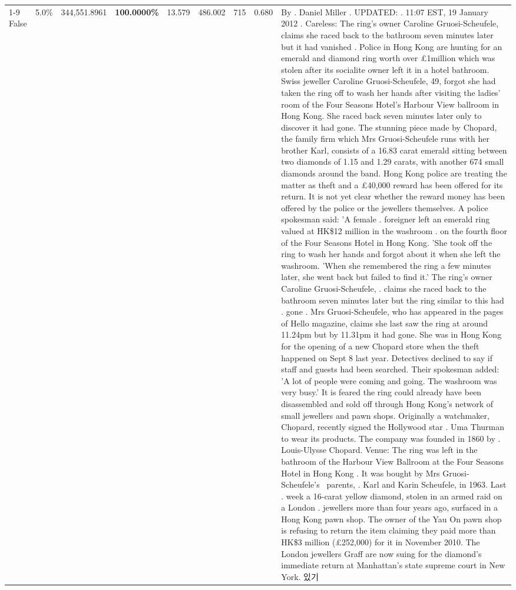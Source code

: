 \begin{table}[H]
\begin{tabular}{lllrlllll}
\cline{1-9}
False & 5.0\% & 344,551.8961 & \bfseries \color{red} 100.0000\% & 13.579 & 486.002 & 715 & 0.680 & By . Daniel Miller . UPDATED: . 11:07 EST, 19 January 2012 . Careless: The ring's owner Caroline Gruosi-Scheufele, claims she raced back to the bathroom seven minutes later but it had vanished . Police in Hong Kong are hunting for an emerald and diamond ring worth over £1million which was stolen after its socialite owner left it in a hotel bathroom. Swiss jeweller Caroline Gruosi-Scheufele, 49, forgot she had taken the ring off to wash her hands after visiting the ladies' room of the Four Seasons Hotel's Harbour View ballroom in Hong Kong. She raced back seven minutes later only to discover it had gone. The stunning piece made by Chopard, the family firm which Mrs Gruosi-Scheufele runs with her brother Karl, consists of a 16.83 carat emerald sitting between two diamonds of 1.15 and 1.29 carats, with another 674 small diamonds around the band. Hong Kong police are treating the matter as theft and a £40,000 reward has been offered for its return. It is not yet clear whether the reward money has been offered by the police or the jewellers themselves. A police spokesman said: 'A female . foreigner left an emerald ring valued at HK\$12 million in the washroom . on the fourth floor of the Four Seasons Hotel in Hong Kong. 'She took off the ring to wash her hands and forgot about it when she left the washroom. 'When she remembered the ring a few minutes later, she went back but failed to find it.' The ring's owner Caroline Gruosi-Scheufele, . claims she raced back to the bathroom seven minutes later but the ring similar to this had . gone . Mrs Gruosi-Scheufele, who has appeared in the pages of Hello magazine, claims she last saw the ring at around 11.24pm but by 11.31pm it had gone. She was in Hong Kong for the opening of a new Chopard store when the theft happened on Sept 8 last year. Detectives declined to say if staff and guests had been searched. Their spokesman added: 'A lot of people were coming and going. The washroom was very busy.' It is feared the ring could already have been disassembled and sold off through Hong Kong's network of small jewellers and pawn shops. Originally a watchmaker, Chopard, recently signed the Hollywood star . Uma Thurman to wear its products. The company was founded in 1860 by . Louis-Ulysse Chopard. Venue: The ring was left in the bathroom of the Harbour View Ballroom at the Four Seasons Hotel in Hong Kong . It was bought by Mrs Gruosi-Scheufele's  parents, . Karl and Karin Scheufele, in 1963. Last . week a 16-carat yellow diamond, stolen in an armed raid on a London . jewellers more than four years ago, surfaced in a Hong Kong pawn shop. The owner of the Yau On pawn shop is refusing to return the item claiming they paid more than HK\$3 million (£252,000) for it in November 2010. The London jewellers Graff are now suing for the diamond’s immediate return at Manhattan’s state supreme court in New York. 있기 \\

\end{tabular}
\end{table}
